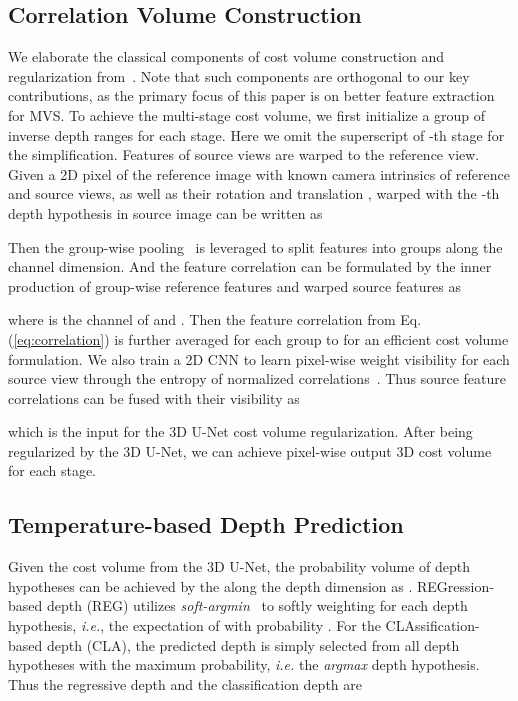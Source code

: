 \documentclass[10pt]{article} \usepackage[preprint]{tmlr}
\begin{document}
\subsection{Correlation Volume Construction}
\label{sec:correlation_volume}

We elaborate the classical components of cost volume construction and regularization from~\citet{gu2020cascade,zhang2020visibility,giang2021curvature}. Note that such components are orthogonal to our key contributions, as the primary focus of this paper is on better feature extraction for MVS.
To achieve the multi-stage cost volume, we first initialize a group of inverse depth ranges  for each stage. 
Here we omit the superscript of -th stage for the simplification.
Features of source views are warped to the reference view. Given a 2D pixel  of the reference image  with known camera intrinsics  of reference and source views, as well as their rotation  and translation ,  warped  with the -th depth hypothesis in source image  can be written as

Then the group-wise pooling~\citep{guo2019group} is leveraged to split features into  groups along the channel dimension. And the feature correlation  can be formulated by the inner production of group-wise reference features
 and warped source features  as

where  is the channel of  and .
Then the feature correlation from Eq.(\ref{eq:correlation}) is further averaged for each group to  for an efficient cost volume formulation. 
We also train a 2D CNN to learn pixel-wise weight visibility  for each source view through the entropy of normalized correlations~\citep{zhang2020visibility,giang2021curvature}. Thus  source feature correlations can be fused with their visibility as

which is the input for the 3D U-Net cost volume regularization. After being regularized by the 3D U-Net, we can achieve pixel-wise output 3D cost volume  for each stage.


\subsection{Temperature-based Depth Prediction}
\label{sec:loss}
Given the cost volume  from the 3D U-Net, the probability volume of depth hypotheses can be achieved by the  along the depth dimension as .
REGression-based depth (REG) utilizes \emph{soft-argmin}~\citep{kendall2017end} to softly weighting for each depth hypothesis, \emph{i.e.}, the expectation of  with probability . 
For the CLAssification-based depth (CLA), the predicted depth  is simply selected from all depth hypotheses with the maximum probability, \emph{i.e.} the \emph{argmax} depth hypothesis.
Thus the regressive depth  and the classification depth  are
\end{document}

